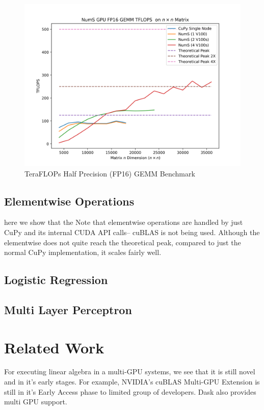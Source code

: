 \documentclass{article}
\begin{document}
\begin{figure}
  \centerline{\includegraphics[width=5in]{figures/NumS_GPU_TFLOPS_FP16GEMM.png}}
  \caption{TeraFLOPs Half Precision (FP16) GEMM Benchmark}
  \label{fig:fp16gemm}
\end{figure}


\subsection{Elementwise Operations}
here we show that the 
Note that elementwise operations are handled by just CuPy and its internal CUDA API calls-- cuBLAS is not being used. Although the elementwise does not quite reach the theoretical peak, compared to just the normal CuPy implementation, it scales fairly well. 
 

\subsection{Logistic Regression}

\subsection{Multi Layer Perceptron}


\section{Related Work}
For executing linear algebra in a multi-GPU systems, we see that it is still novel and in it's early stages. For example, NVIDIA's cuBLAS Multi-GPU Extension is still in it's Early Access phase to limited group of developers. \cite{cublasmg} Dask also provides multi GPU support.
\end{document}
